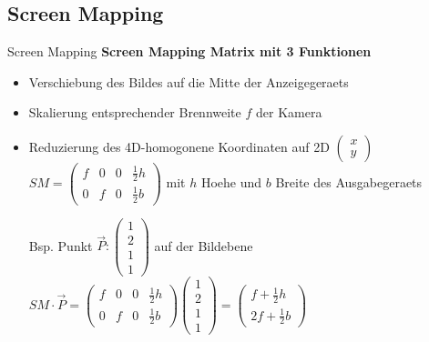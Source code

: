\documentclass[10pt,aspectratio=169]{beamer}
\begin{document}
  \subsection{Screen Mapping}
  \begin{frame}{Screen Mapping}
    \textbf{Screen Mapping Matrix mit 3 Funktionen}
    \begin{itemize}
      \item Verschiebung des Bildes auf die Mitte der Anzeigegeraets
      \item Skalierung entsprechender Brennweite $f$ der Kamera
      \item Reduzierung des 4D-homogonene Koordinaten auf 2D $\begin{pmatrix}
        x\\y
      \end{pmatrix}$\\
      $SM = \begin{pmatrix}
        f & 0 & 0 & \frac{1}{2}h\\
        0 & f & 0 & \frac{1}{2}b
      \end{pmatrix}$ mit $h$ Hoehe und $b$ Breite des Ausgabegeraets
      \begin{center}        
        Bsp. Punkt $\vec{P}: \begin{pmatrix}
          1\\2\\1\\1
        \end{pmatrix}$ auf der Bildebene\\
        $SM \cdot \vec{P} = \begin{pmatrix}
          f & 0 & 0 & \frac{1}{2}h\\
          0 & f & 0 & \frac{1}{2}b
        \end{pmatrix}
        \begin{pmatrix}
          1\\2\\1\\1
        \end{pmatrix}
        = \begin{pmatrix}
          f + \frac{1}{2}h\\
          2f + \frac{1}{2}b
        \end{pmatrix}$
      \end{center}
    \end{itemize}
  \end{frame}
\end{document}
